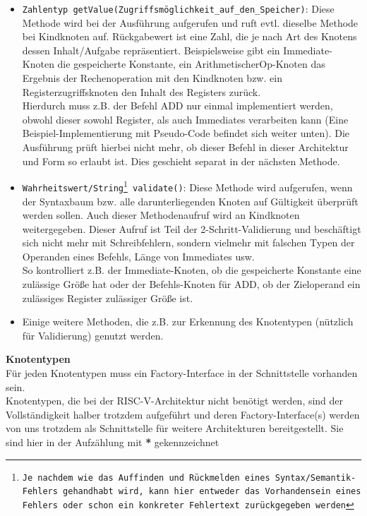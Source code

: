\begin{itemize}
	\item \texttt{Zahlentyp getValue(Zugriffsmöglichkeit\_auf\_den\_Speicher)}: Diese Methode wird bei der Ausführung aufgerufen und ruft evtl. dieselbe Methode bei Kindknoten auf. Rückgabewert ist eine Zahl, die je nach Art des Knotens dessen Inhalt/Aufgabe repräsentiert. Beispielsweise gibt ein Immediate-Knoten die gespeicherte Konstante, ein ArithmetischerOp-Knoten das Ergebnis der Rechenoperation mit den Kindknoten bzw. ein Registerzugriffsknoten den Inhalt des Registers zurück.\\
	Hierdurch muss z.B. der Befehl ADD nur einmal implementiert werden, obwohl dieser sowohl Register, als auch Immediates verarbeiten kann (Eine Beispiel-Implementierung mit Pseudo-Code befindet sich weiter unten). Die Ausführung prüft hierbei nicht mehr, ob dieser Befehl in dieser Architektur und Form so erlaubt ist. Dies geschieht separat in der nächsten Methode.

	\item \texttt{Wahrheitswert/String\footnote{Je nachdem wie das Auffinden und Rückmelden eines Syntax/Semantik-Fehlers gehandhabt wird, kann hier entweder das Vorhandensein eines Fehlers oder schon ein konkreter Fehlertext zurückgegeben werden} validate()}: Diese Methode wird aufgerufen, wenn der Syntaxbaum bzw. alle darunterliegenden Knoten auf Gültigkeit überprüft werden sollen. Auch dieser Methodenaufruf wird an Kindknoten weitergegeben. Dieser Aufruf ist Teil der 2-Schritt-Validierung und beschäftigt sich nicht mehr mit Schreibfehlern, sondern vielmehr mit falschen Typen der Operanden eines Befehls, Länge von Immediates usw.\\
	So kontrolliert z.B. der Immediate-Knoten, ob die gespeicherte Konstante eine zulässige Größe hat oder der Befehls-Knoten für ADD, ob der Zieloperand ein zulässiges Register zulässiger Größe ist.

	\item Einige weitere Methoden, die z.B. zur Erkennung des Knotentypen (nützlich für Validierung) genutzt werden.
\end{itemize}
\textbf{Knotentypen}\\
Für jeden Knotentypen muss ein Factory-Interface in der Schnittstelle vorhanden sein.\\
Knotentypen, die bei der RISC-V-Architektur nicht benötigt werden, sind der Vollständigkeit halber trotzdem aufgeführt und deren Factory-Interface(s) werden von uns trotzdem als Schnittstelle für weitere Architekturen bereitgestellt. Sie sind hier in der Aufzählung mit \textbf{*} gekennzeichnet
